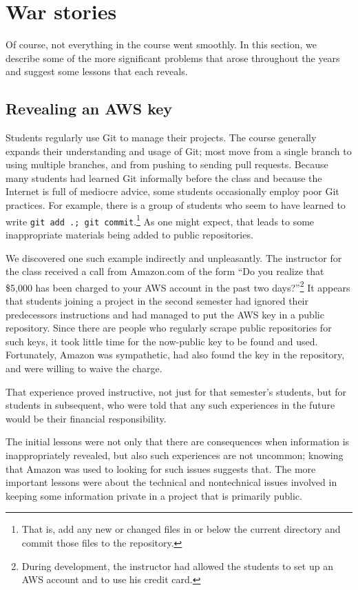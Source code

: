 \section{War stories}

Of course, not everything in the course went smoothly.  In this section,
we describe some of the more significant problems that arose throughout
the years and suggest some lessons that each reveals.

\subsection{Revealing an AWS key}

Students regularly use Git to manage their projects.  The course
generally expands their understanding and usage of Git; most move
from a single branch to using multiple branches, and from pushing
to sending pull requests.  Because many students had learned Git
informally before the class and because the Internet is full of
mediocre advice, some students occasionally employ poor Git practices.
For example, there is a group of students who seem to have learned
to write \texttt{git add .; git commit}.\footnote{That is, add any
new or changed files in or below the current directory and commit
those files to the repository.}  As one might expect, that leads
to some inappropriate materials being added to public repositories.

We discovered one such example indirectly and unpleasantly.  The
instructor for the class received a call from Amazon.com of the
form ``Do you realize that \$5,000 has been charged to your AWS
account in the past two days?''\footnote{During development, the
instructor had allowed the students to set up an AWS account and
to use his credit card.}  It appears that students joining a project
in the second semester had ignored their predecessors instructions
and had managed to put the AWS key in a public repository.  Since
there are people who regularly scrape public repositories for such
keys, it took little time for the now-public key to be found and
used.  Fortunately, Amazon was sympathetic, had also found the
key in the repository, and were willing to waive the charge.

That experience proved instructive, not just for that semester's
students, but for students in subsequent, who were told that any
such experiences in the future would be their financial responsibility.

The initial lessons were not only that there are consequences when
information is inappropriately revealed, but also such experiences
are not uncommon; knowing that Amazon was used to looking for such
issues suggests that.  The more important lessons were about the
technical and nontechnical issues involved in keeping some information
private in a project that is primarily public.

